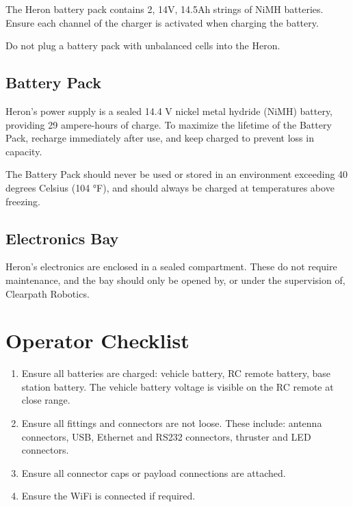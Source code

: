 \documentclass[]{clearpath-latex/clearpath-manual}
\begin{document}
\begin{warning}
The Heron battery pack contains 2, 14V, 14.5Ah strings of NiMH batteries. Ensure each channel of the charger is activated when charging the battery.
\end{warning}

\begin{warning}
Do not plug a battery pack with unbalanced cells into the Heron.
\end{warning}

\subsection{Battery Pack}
Heron's power supply is a sealed 14.4 V nickel metal hydride (NiMH) battery, providing 29 ampere-hours of charge. To maximize the lifetime of the Battery Pack, recharge immediately after use, and keep charged to prevent loss in capacity.

The Battery Pack should never be used or stored in an environment exceeding 40 degrees Celsius (104 °F), and should always be charged at temperatures above freezing.

\subsection{Electronics Bay}
Heron's electronics are enclosed in a sealed compartment. These do not require maintenance, and the bay should only be opened by, or under the supervision of, Clearpath Robotics.

\newpage

\section{Operator Checklist}

\begin{enumerate}
\item Ensure all batteries are charged: vehicle battery, RC remote battery, base station battery. The vehicle battery voltage is visible on the RC remote at close range.
\item Ensure all fittings and connectors are not loose. These include: antenna connectors, USB, Ethernet and RS232 connectors, thruster and LED connectors.
\item Ensure all connector caps or payload connections are attached.
\item Ensure the WiFi is connected if required.
\end{enumerate}
\end{document}
